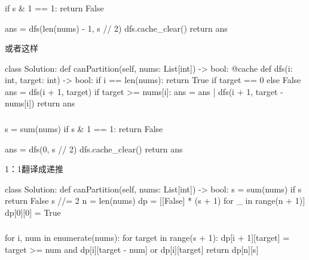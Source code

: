 \begin{frame}[fragile]          %
  \frametitle{}
  \begin{codeblock}[language=python]{}
  if s & 1 == 1:
  return False

  ans = dfs(len(nums) - 1, s // 2)
  dfs.cache_clear()
  return ans

  \end{codeblock}
  或者这样
  \begin{codeblock}[language=python]{}
class Solution:
  def canPartition(self, nums: List[int]) -> bool:
    @cache
    def dfs(i: int, target: int) -> bool:
        if i == len(nums):
            return True if target == 0 else False
        ans = dfs(i + 1, target)
        if target >= nums[i]:
            ans = ans | dfs(i + 1, target - nums[i])
        return ans
    \end{codeblock}
\end{frame}

\begin{frame}[fragile]          %
  \frametitle{}
  \begin{codeblock}[language=python]{}
    s = sum(nums)
    if s & 1 == 1:
        return False
    
    ans = dfs(0, s // 2)
    dfs.cache_clear()
    return ans

  \end{codeblock}
  1：1翻译成递推
  \begin{codeblock}[language=python]{}
class Solution:
    def canPartition(self, nums: List[int]) -> bool:
        s = sum(nums)
        if s %
            return False
        s //= 2
        n = len(nums)
        dp = [[False] * (s + 1) for _ in range(n + 1)]
        dp[0][0] = True
 
    \end{codeblock}
\end{frame}


\begin{frame}[fragile]          %
  \frametitle{}
  \begin{codeblock}[language=python]{}
    for i, num in enumerate(nums):
    for target in range(s + 1):
        dp[i + 1][target] = target >= num and dp[i][target - num] or dp[i][target]
    return dp[n][s]

  \end{codeblock}
\end{frame}



